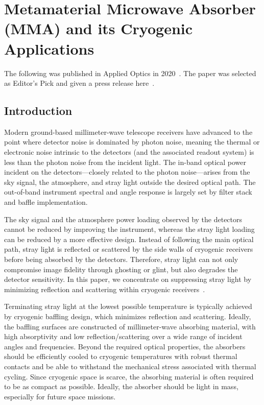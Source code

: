 \chapter{Metamaterial Microwave Absorber (MMA) and its Cryogenic Applications}
\label{ch:mma}
The following was published in Applied Optics in 2020~\cite{Xu_2021}.  The paper was selected as Editor's Pick and given a press release here~\cite{MMApress}.
\section{Introduction}
Modern ground-based millimeter-wave telescope receivers have advanced to the point where detector noise is dominated by photon noise, meaning the thermal or electronic noise intrinsic to the detectors (and the associated readout system) is less than the photon noise from the incident light. The in-band optical power incident on the detectors---closely related to the photon noise---arises from the sky signal, the atmosphere, and stray light outside the desired optical path. The out-of-band instrument spectral and angle response is largely set by filter stack and baffle implementation.

The sky signal and the atmosphere power loading observed by the detectors cannot be reduced by improving the instrument, whereas the stray light loading can be reduced by a more effective design. Instead of following the main optical path, stray light is reflected or scattered by the side walls of cryogenic receivers before being absorbed by the detectors. Therefore, stray light can not only compromise image fidelity through ghosting or glint, but also degrades the detector sensitivity. In this paper, we concentrate on suppressing stray light by minimizing reflection and scattering within cryogenic receivers~\cite{iuliano/etal:2018, thornton/etal:2016, sharp/etal:2008}.

Terminating stray light at the lowest possible temperature is typically achieved by cryogenic baffling design, which minimizes reflection and scattering.  Ideally, the baffling surfaces are constructed of millimeter-wave absorbing material, with high absorptivity and low reflection/scattering over a wide range of incident angles and frequencies. Beyond the required optical properties, the absorbers should be efficiently cooled to cryogenic temperatures with robust thermal contacts and be able to withstand the mechanical stress associated with thermal cycling. Since cryogenic space is scarce, the absorbing material is often required to be as compact as possible. Ideally, the absorber should be light in mass, especially for future space missions.

